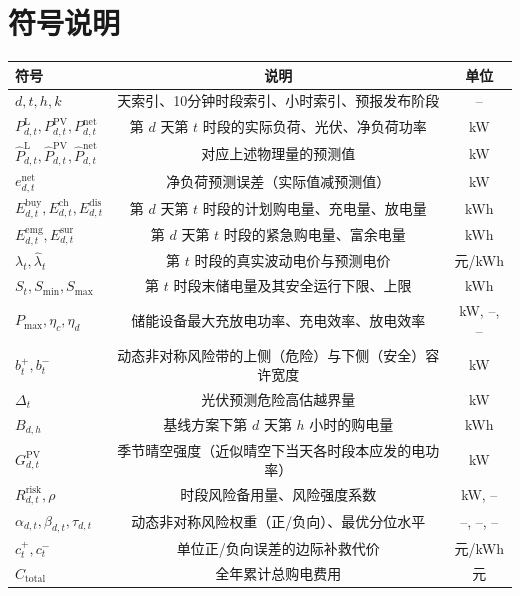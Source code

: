 \documentclass[withoutpreface,bwprint]{cumcmthesis}
\begin{document}
\vspace*{-7pt}
\section{符号说明}
\vspace*{-7pt}
\begin{table}[h!]
	\centering
	\renewcommand{\arraystretch}{1.2}
	\setlength{\tabcolsep}{5pt}
	\label{tab:符号说明}
	\begin{tabular}{lcc}
		\toprule[1.5pt]
		\textbf{符号} & \textbf{说明} & \textbf{单位} \\
		\midrule
		\rowcolor{LightBlue}
		$d, t, h, k$ & 天索引、10分钟时段索引、小时索引、预报发布阶段 & -- \\
		$P^{\mathrm{L}}_{d,t}, P^{\mathrm{PV}}_{d,t}, P^{\mathrm{net}}_{d,t}$ & 第 $d$ 天第 $t$ 时段的实际负荷、光伏、净负荷功率 & kW \\
		\rowcolor{LightBlue}
		$\hat{P}^{\mathrm{L}}_{d,t}, \hat{P}^{\mathrm{PV}}_{d,t}, \hat{P}^{\mathrm{net}}_{d,t}$ & 对应上述物理量的预测值 & kW \\
		$e^{\mathrm{net}}_{d,t}$ & 净负荷预测误差（实际值减预测值） & kW \\
		\rowcolor{LightBlue}
		$E^{\mathrm{buy}}_{d,t}, E^{\mathrm{ch}}_{d,t}, E^{\mathrm{dis}}_{d,t}$ & 第 $d$ 天第 $t$ 时段的计划购电量、充电量、放电量 & kWh \\
		$E^{\mathrm{emg}}_{d,t}, E^{\mathrm{sur}}_{d,t}$ & 第 $d$ 天第 $t$ 时段的紧急购电量、富余电量 & kWh \\
		\rowcolor{LightBlue}
		$\lambda_t, \hat{\lambda}_t$ & 第 $t$ 时段的真实波动电价与预测电价 & 元/kWh \\
		$S_t, S_{\min}, S_{\max}$ & 第 $t$ 时段末储电量及其安全运行下限、上限 & kWh \\
		\rowcolor{LightBlue}
		$P_{\max}, \eta_c, \eta_d$ & 储能设备最大充放电功率、充电效率、放电效率 & kW, --, -- \\
		$b^+_t, b^-_t$ & 动态非对称风险带的上侧（危险）与下侧（安全）容许宽度 & kW \\
		\rowcolor{LightBlue}
		$\Delta_t$ & 光伏预测危险高估越界量 & kW \\
		$B_{d,h}$ & 基线方案下第 $d$ 天第 $h$ 小时的购电量 & kWh \\
		\rowcolor{LightBlue}
		$G^{\mathrm{PV}}_{d,t}$ & 季节晴空强度（近似晴空下当天各时段本应发的电功率） & kW \\
		$R^{\mathrm{risk}}_{d,t}, \rho$ & 时段风险备用量、风险强度系数 & kW, -- \\
		\rowcolor{LightBlue}
		$\alpha_{d,t}, \beta_{d,t}, \tau_{d,t}$ & 动态非对称风险权重（正/负向）、最优分位水平 & --, --, -- \\
		$c^+_t, c^-_t$ & 单位正/负向误差的边际补救代价 & 元/kWh \\
		\rowcolor{LightBlue}
		$C_{\mathrm{total}}$ & 全年累计总购电费用 & 元 \\
		\bottomrule[1.5pt]
	\end{tabular}
\end{table}
\end{document}
